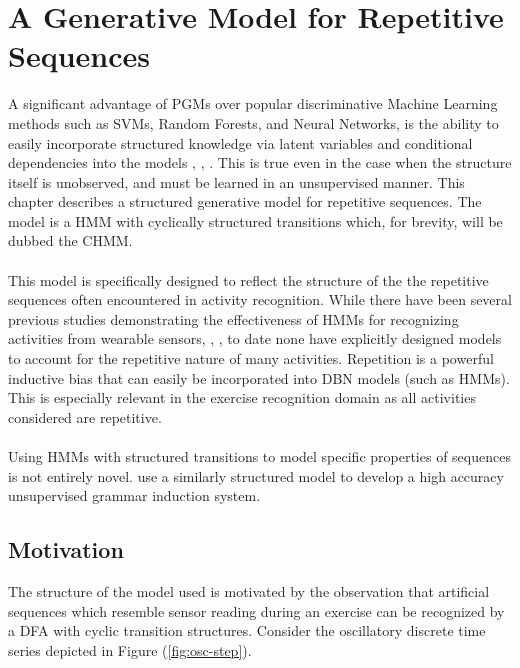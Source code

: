 \documentclass[12pt]{report}
\newcommand{\1}[0]{\mathbbm{1}}
\begin{document}
\chapter{A Generative Model for Repetitive Sequences}
A significant advantage of \acp{PGM} over popular discriminative Machine Learning methods
such as \acp{SVM}, Random Forests, and Neural Networks, is the ability to easily incorporate
structured knowledge via latent variables and conditional dependencies into the models 
\cite{structured-priors}, \cite{poverty-stimulus}, \cite{how-to-grow-a-mind}.
This is true even in the case when the structure itself is unobserved, and must
be learned in an unsupervised manner. This chapter describes a structured generative model for 
repetitive sequences. The model is a \ac{HMM} with cyclically structured transitions which, 
for brevity, will be dubbed the \ac{CHMM}. 
\\\\
This model is specifically designed to reflect the structure of the the repetitive sequences
often encountered in activity recognition. While there have been several previous studies demonstrating 
the effectiveness of \acp{HMM} for recognizing activities from wearable sensors, \cite{hhmm-lee}, 
\cite{factored-hmm-tran}, to date none have explicitly designed models to account for the repetitive nature 
of many activities. Repetition is a powerful inductive bias that can easily be incorporated into 
\ac{DBN} models (such as \acp{HMM}). This is especially relevant in the exercise recognition
domain as all activities considered are repetitive. 
\\\\
Using \ac{HMM}s with structured transitions to model specific properties of sequences is 
not entirely novel. \cite{cascaded-finite-state} use a similarly structured model to develop
a high accuracy unsupervised grammar induction system.

\section{Motivation}
The structure of the model used is motivated by the observation that artificial 
sequences which resemble sensor reading during an exercise can be recognized by a \ac{DFA}
with cyclic transition structures. Consider the oscillatory discrete time series depicted 
in Figure (\ref{fig:osc-step}). 
\end{document}
